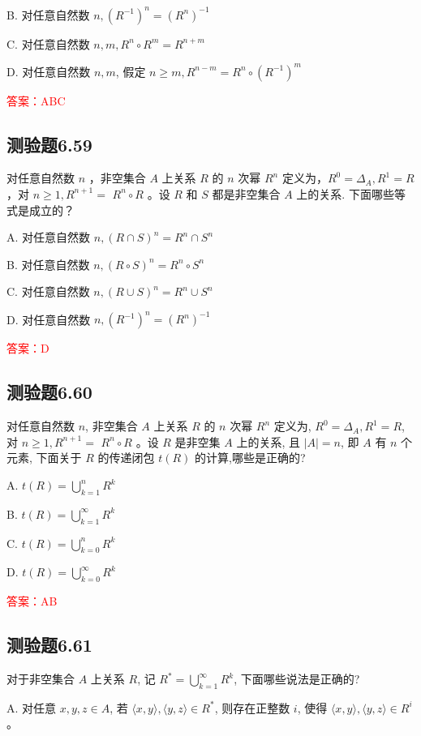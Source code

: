 \documentclass[UTF8, heading=true]{ctexart}
\begin{document}
B. 对任意自然数 $n,\left(R^{-1}\right)^n=\left(R^n\right)^{-1}$

C. 对任意自然数 $n, m, R^n \circ R^m=R^{n+m}$

D. 对任意自然数 $n, m$, 假定 $n \geq m, R^{n-m}=R^n \circ\left(R^{-1}\right)^m$

\textcolor{red}{答案：ABC}

\subsection{测验题6.59}

对任意自然数 $n$ ，非空集合 $A$ 上关系 $R$ 的 $n$ 次幂 $R^n$ 定义为，$R^0=\Delta_A, R^1=R$ ，对 $n \geq 1, R^{n+1}=$
$R^n \circ R$ 。设 $R$ 和 $S$ 都是非空集合 $A$ 上的关系. 下面哪些等式是成立的？

A. 对任意自然数 $n,(R \cap S)^n=R^n \cap S^n$

B. 对任意自然数 $n,(R \circ S)^n=R^n \circ S^n$


C. 对任意自然数 $n,(R \cup S)^n=R^n \cup S^n$

D. 对任意自然数 $n,\left(R^{-1}\right)^n=\left(R^n\right)^{-1}$

\textcolor{red}{答案：D}

\subsection{测验题6.60}

对任意自然数 $n$, 非空集合 $A$ 上关系 $R$ 的 $n$ 次幂 $R^n$ 定义为, $R^0=\Delta_A, R^1=R$, 对 $n \geq 1, R^{n+1}=$ $R^n \circ R$ 。设 $R$ 是非空集 $A$ 上的关系, 且 $|A|=n$, 即 $A$ 有 $n$ 个元素, 下面关于 $R$ 的传递闭包 $t(R)$ 的计算,哪些是正确的?

A. $t(R)=\bigcup_{k=1}^n R^k$

B. $t(R)=\bigcup_{k=1}^{\infty} R^k$

C. $t(R)=\bigcup_{k=0}^n R^k$

D. $t(R)=\bigcup_{k=0}^{\infty} R^k$

\textcolor{red}{答案：AB}

\subsection{测验题6.61}
对于非空集合 $A$ 上关系 $R$, 记 $R^*=\bigcup_{k=1}^{\infty} R^k$, 下面哪些说法是正确的?

A. 对任意 $x, y, z \in A$, 若 $\langle x, y\rangle,\langle y, z\rangle \in R^*$, 则存在正整数 $i$, 使得 $\langle x, y\rangle,\langle y, z\rangle \in R^i$ 。
\end{document}
